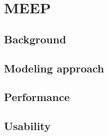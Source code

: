 \chapter{MEEP} \label{ch:meep}

\section{Background}
\section{Modeling approach}
\section{Performance}
\section{Usability}


